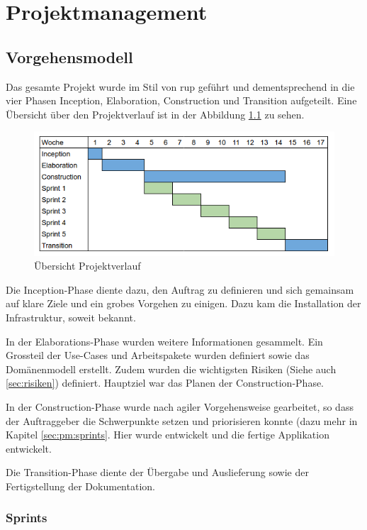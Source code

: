 
\chapter{Projektmanagement}

\section{Vorgehensmodell}

Das gesamte Projekt wurde im Stil von \gls{rup} geführt und dementsprechend in die vier Phasen Inception, Elaboration, Construction und Transition aufgeteilt. Eine Übersicht über den Projektverlauf ist in der Abbildung \ref{fig:pm:project_overview} zu sehen.

\begin{figure}[H]
	\centering
	\includegraphics[width=0.8\linewidth]{fig/project_overview}
	\caption{Übersicht Projektverlauf}
	\label{fig:pm:project_overview}
\end{figure}

Die Inception-Phase diente dazu, den Auftrag zu definieren und sich gemainsam auf klare Ziele und ein grobes Vorgehen zu einigen. Dazu kam die Installation der Infrastruktur, soweit bekannt.

In der Elaborations-Phase wurden weitere Informationen gesammelt. Ein Grossteil der Use-Cases und Arbeitspakete wurden definiert sowie das Domänenmodell erstellt. Zudem wurden die wichtigsten Risiken (Siehe auch \ref{sec:risiken}) definiert. Hauptziel war das Planen der Construction-Phase.

In der Construction-Phase wurde nach agiler Vorgehensweise gearbeitet, so dass der Auftraggeber die Schwerpunkte setzen und priorisieren konnte (dazu mehr in Kapitel \ref{sec:pm:sprints}. Hier wurde entwickelt und die fertige Applikation entwickelt.

Die Transition-Phase diente der Übergabe und Auslieferung sowie der Fertigstellung der Dokumentation.


\subsection*{Sprints} \label{sec:pm:sprints}


